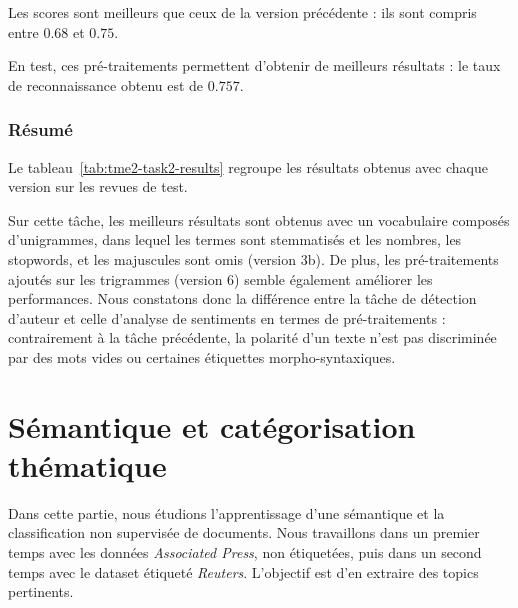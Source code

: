\documentclass[a4paper]{article}
\newcommand{\tabref}[1]{tableau~\ref{#1}}
\begin{document}
Les scores sont meilleurs que ceux de la version précédente : ils sont compris
entre $0.68$ et $0.75$.

En test, ces pré-traitements permettent d'obtenir de meilleurs résultats : le
taux de reconnaissance obtenu est de $0.757$.

\subsubsection{Résumé}

Le \tabref{tab:tme2-task2-results} regroupe les résultats obtenus avec chaque
version sur les revues de test. 

\begin{table}[H]
\centering
{}
\caption{taux de reconnaissance obtenu sur le corpus de test pour chaque version}
\label{tab:tme2-task2-results}
\end{table}

Sur cette tâche, les meilleurs résultats sont obtenus avec un vocabulaire
composés d'unigrammes, dans lequel les termes sont stemmatisés et les nombres,
les stopwords, et les majuscules sont omis (version 3b). De plus, les
pré-traitements ajoutés sur les trigrammes (version 6) semble également
améliorer les performances. Nous constatons donc la différence entre la tâche de
détection d'auteur et celle d'analyse de sentiments en termes de pré-traitements
: contrairement à la tâche précédente, la polarité d'un texte n'est pas
discriminée par des mots vides ou certaines étiquettes morpho-syntaxiques. 

\newpage
\section{Sémantique et catégorisation thématique}

Dans cette partie, nous étudions l'apprentissage d'une sémantique et la
classification non supervisée de documents. Nous travaillons dans un premier
temps avec les données \emph{Associated Press}, non étiquetées, puis dans un
second temps avec le dataset étiqueté \emph{Reuters}. L'objectif est d'en
extraire des topics pertinents.
\end{document}
